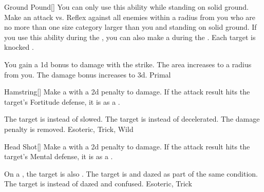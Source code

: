 \lowercase{\hypertarget{maneuver:Ground Pound}{}}\label{maneuver:Ground Pound}
\hypertarget{maneuver:Ground Pound}{}
\begin{freeability}{Ground Pound}[]
You can only use this ability while standing on solid ground.
Make an attack vs. Reflex against all enemies within a \areasmall radius from you who are no more than one size category larger than you and standing on solid ground.
If you use this ability during the , you can also make a  during the .
\hit Each target is knocked \prone.

\rankline
{} You gain a \plus1d bonus to damage with the strike.
 The area increases to a \arealarge radius from you.
 The damage bonus increases to \plus3d.
 Primal
\end{freeability}
\vspace{0.25em}



\lowercase{\hypertarget{maneuver:Hamstring}{}}\label{maneuver:Hamstring}
\hypertarget{maneuver:Hamstring}{}
\begin{freeability}{Hamstring}[]
Make a  with a \minus2d penalty to damage.
If the attack result hits the target's Fortitude defense,
it is  as a .

\rankline
{} The target is  instead of slowed.
 The target is  instead of decelerated.
 The damage penalty is removed.
 Esoteric, Trick, Wild
\end{freeability}
\vspace{0.25em}



\lowercase{\hypertarget{maneuver:Head Shot}{}}\label{maneuver:Head Shot}
\hypertarget{maneuver:Head Shot}{}
\begin{freeability}{Head Shot}[]
Make a  with a \minus2d penalty to damage.
If the attack result hits the target's Mental defense,
it is  as a .

\rankline
{} On a , the target is also .
 The target is  and dazed as part of the same condition.
 The target is  instead of dazed and confused.
 Esoteric, Trick
\end{freeability}
\vspace{0.25em}




